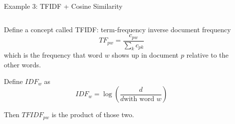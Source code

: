 \documentclass[notes,11pt, aspectratio=169]{beamer}
\newenvironment{wideitemize}{\itemize\addtolength{\itemsep}{10pt}}{\enditemize}
\begin{document}
  \begin{frame}{Example 3: TFIDF + Cosine Similarity}
    \begin{columns}[onlytextwidth, T] %
      \begin{column}{.5\textwidth}
        \begin{wideitemize}
        \item Define a concept called TFIDF: term-frequency inverse document frequency
          \begin{equation}
            TF_{pw} = \frac{c_{pw}}{\sum_{k}c_{pk}}
          \end{equation}
          which is the frequency that word $w$ shows up in document $p$ relative to the other words.
        \item Define $IDF_{w}$ as
          \begin{equation}
            IDF_{w} = \log\left(\frac{d}{d \text{with word } w}\right)
          \end{equation}
        \item Then $TFIDF_{pw}$ is  the product of those two.
        \end{wideitemize}
      \end{column}%
      \hfill%
      \begin{column}{.5\textwidth}
      \end{column}%
    \end{columns}
  \end{frame}
\end{document}
